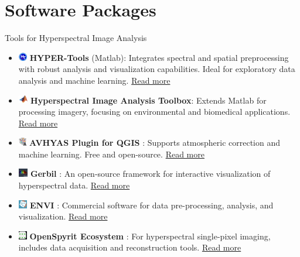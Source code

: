 \documentclass[10pt,svgnames,fragile]{beamer}
\begin{document}
\section{Software Packages}
\begin{frame}{Tools for Hyperspectral Image Analysis}
\small %
\begin{itemize}
    \item \includegraphics[height=1em]{matlab_icon.png} \textbf{HYPER-Tools} (Matlab)\cite{mobarakiHYPERToolsGraphicalUserfriendly2018}: Integrates spectral and spatial preprocessing with robust analysis and visualization capabilities. Ideal for exploratory data analysis and machine learning.  \href{https://www.hypertools.org}{\color{blue}Read more}
    \item \includegraphics[height=1em]{matlab2_icon.png} \textbf{Hyperspectral Image Analysis Toolbox}\cite{arzuaga-cruzMATLABToolboxHyperspectral2004}: Extends Matlab for processing imagery, focusing on environmental and biomedical applications. \href{https://consensus.app/papers/matlab-toolbox-hyperspectral-image-analysis-arzuagacruz/c1ab5fe0544557e7af3de5e2ed62250a/?utm_source=chatgpt}{\color{blue}Read more}
    \item \includegraphics[height=1em]{qgis_icon.png} \textbf{AVHYAS Plugin for QGIS} \cite{lyngdohAVHYASFreeOpen2021}: Supports atmospheric correction and machine learning. Free and open-source. \href{https://sites.google.com/view/avhyas-sac-isro/home}{\color{blue}Read more}
    \item \includegraphics[height=1em]{generic_icon.png} \textbf{Gerbil} \cite{jordanNovelFrameworkInteractive2016}: An open-source framework for interactive visualization of hyperspectral data. \href{http://gerbilvis.org}{\color{blue}Read more}
    \item \includegraphics[height=1em]{envi_icon.png} \textbf{ENVI} \cite{xingHyperspectralImageAnalysis2001}: Commercial software for data pre-processing, analysis, and visualization. \href{hhttps://www.nv5geospatialsoftware.com/Products/ENVI}{\color{blue}Read more}
    \item \includegraphics[height=1em]{open_source_icon.png} \textbf{OpenSpyrit Ecosystem} \cite{benetimartinsOpenSpyritEcosystemOpen2023}: For hyperspectral single-pixel imaging, includes data acquisition and reconstruction tools. \href{https://github.com/openspyrit/spyrit}{\color{blue}Read more}
\end{itemize}
\end{frame}
\end{document}

